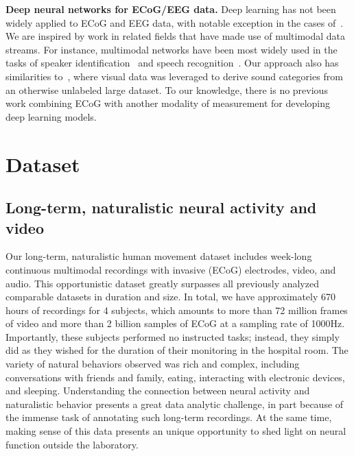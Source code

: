\documentclass[letterpaper]{article} %
\begin{document}
\textbf{Deep neural networks for ECoG/EEG data.}
Deep learning has not been widely applied to ECoG and EEG data, with notable exception in the cases of~\cite{krug2008cnn,wang2013deep,nurse2016decoding,schirrmeister2017deep}.
We are inspired by work in related fields that have made use of multimodal data streams. 
For instance, multimodal networks have been most widely used in the tasks of speaker identification~\cite{ren2016look} and speech recognition~\cite{ngiam2011multimodal}.
Our approach also has similarities to~\cite{Aytar2016}, where visual data was leveraged to derive sound categories from an otherwise unlabeled large dataset.
To our knowledge, there is no previous work combining ECoG with another modality of measurement for developing deep learning models.



\section{Dataset}


\subsection{Long-term, naturalistic neural activity and video}

Our long-term, naturalistic human movement dataset includes week-long continuous multimodal recordings with invasive (ECoG) electrodes, video, and audio.
This opportunistic dataset greatly surpasses all previously analyzed comparable datasets in duration and size.
In total, we have approximately 670 hours of recordings for 4 subjects, which amounts to more than 72 million frames of video and more than 2 billion samples of ECoG at a sampling rate of 1000Hz. 
Importantly, these subjects performed no instructed tasks; instead, they simply did as they wished for the duration of their monitoring in the hospital room.
The variety of natural behaviors observed was rich and complex, including conversations with friends and family, eating, interacting with electronic devices, and sleeping.
Understanding the connection between neural activity and naturalistic behavior presents a great data analytic challenge, in part because of the immense task of annotating such long-term recordings.
At the same time, making sense of this data presents an unique opportunity to shed light on neural function outside the laboratory.
\end{document}
